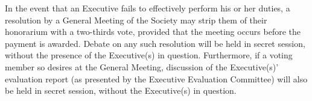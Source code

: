 In the event that an Executive fails to effectively perform his or her duties, a resolution by a General Meeting of the Society may strip them of their honorarium with a two-thirds vote, provided that the meeting occurs before the payment is awarded. Debate on any such resolution will be held in secret session, without the presence of the Executive(s) in question. Furthermore, if a voting member so desires at the General Meeting, discussion of the Executive(s)' evaluation report (as presented by the Executive Evaluation Committee) will also be held in secret session, without the Executive(s) in question.
